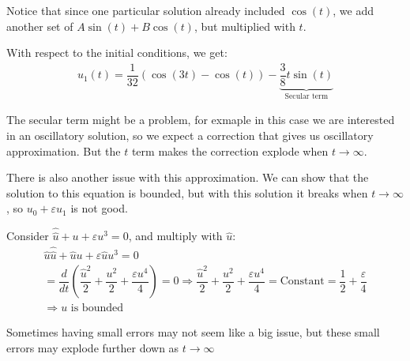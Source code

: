 \noindent Notice that since one particular solution already included $\cos(t)$, we add another set of $A\sin(t)+B\cos(t)$, but multiplied with $t$.\par
\noindent With respect to the initial conditions, we get:
\begin{equation*}
  \begin{gathered}
    u_1(t) = \dfrac{1}{32}(\cos(3t)-\cos(t))-\underbrace{\dfrac{3}{8}t\sin(t)}_{\text{Secular term}}
  \end{gathered}
\end{equation*}\par
\noindent The secular term might be a problem, for exmaple in this case we are interested in an oscillatory solution, so we expect a correction that gives us oscillatory approximation. But the $t$ term makes the correction explode when $t\to\infty$.\par
\noindent There is also another issue with this approximation. We can show that the solution to this equation is bounded, but with this solution it breaks when $t\to\infty$, so $u_0+\varepsilon u_1$ is not good. 
\par\bigskip
\begin{prf}{}
  Consider $\hat{\hat{u}}+u+\varepsilon u^3=0$, and multiply with $\hat{u}$:
  \begin{equation*}
    \begin{gathered}
      \hat{u}\hat{\hat{u}}+\hat{u}u+\varepsilon\hat{u}u^3=0\\
      =\dfrac{d}{dt}\left(\dfrac{\hat{u}^2}{2}+\dfrac{u^2}{2}+\dfrac{\varepsilon u^4}{4}\right) = 0\Rightarrow \dfrac{\hat{u}^2}{2}+\dfrac{u^2}{2}+\dfrac{\varepsilon u^4}{4} = \text{Constant} = \dfrac{1}{2}+\dfrac{\varepsilon}{4}\\
      \Rightarrow u\text{ is bounded}
    \end{gathered}
  \end{equation*}
\end{prf}
\par\bigskip
\noindent Sometimes having small errors may not seem like a big issue, but these small errors may explode further down as $t\to\infty$
\par\bigskip
